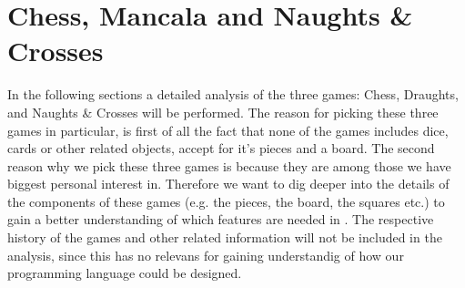 \section{Chess, Mancala and Naughts \& Crosses}

In the following sections a detailed analysis of the three games: Chess, Draughts, and Naughts \& Crosses will be performed. The reason for picking these three games in particular, is first of all the fact that none of the games includes dice, cards or other related objects, accept for it's pieces and a board. The second reason why we pick these three games is because they are among those we have biggest personal interest in. Therefore we want to dig deeper into the details of the components of these games (e.g. the pieces, the board, the squares etc.) to gain a better understanding of which features are needed in \productname. The respective history of the games and other related information will not be included in the analysis, since this has no relevans for gaining understandig of how our programming language could be designed.  




      